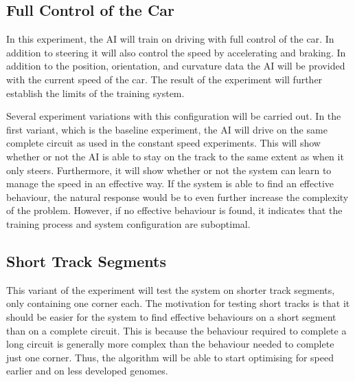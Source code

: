 

\subsection{Full Control of the Car}
\label{method:baseline}
In this experiment, the AI will train on driving with full control of the car. In addition to steering it will also control the speed by accelerating and braking. In addition to the position, orientation, and curvature data the AI will be provided with the current speed of the car. The result of the experiment will further establish the limits of the training system. 

Several experiment variations with this configuration will be carried out. In the first variant, which is the baseline experiment, the AI will drive on the same complete circuit as used in the constant speed experiments. This will show whether or not the AI is able to stay on the track to the same extent as when it only steers. Furthermore, it will show whether or not the system can learn to manage the speed in an effective way. If the system is able to find an effective behaviour, the natural response would be to even further increase the complexity of the problem. However, if no effective behaviour is found, it indicates that the training process and system configuration are suboptimal. 

\subsection{Short Track Segments}
\label{subsec:shorttracksegment}
This variant of the experiment will test the system on shorter track segments, only containing one corner each. The motivation for testing short tracks is that it should be easier for the system to find effective behaviours on a short segment than on a complete circuit. This is because the behaviour required to complete a long circuit is generally more complex than the behaviour needed to complete just one corner. Thus, the algorithm will be able to start optimising for speed earlier and on less developed genomes. 

